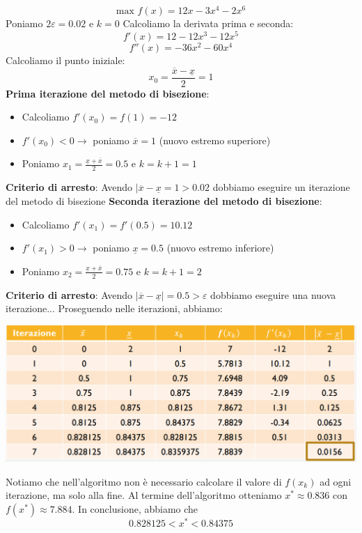 \documentclass[12pt]{article}
\begin{document}
$$\textrm{max } f(x) = 12x - 3x^4 - 2x^6$$
Poniamo $2\varepsilon = 0.02$ e $k = 0$ \newline
Calcoliamo la derivata prima e seconda:
$$f'(x) = 12 - 12x^3 - 12x^5$$
$$f''(x) = -36x^2 - 60x^4$$
Calcoliamo il punto iniziale:
$$x_0 = \frac{\overline{x} - \underline{x}}{2} = 1$$
\textbf{Prima iterazione del metodo di bisezione}:
\begin{itemize}
    \item Calcoliamo $f'(x_0) = f(1) = -12$
    \item $f'(x_0) < 0 \rightarrow$ poniamo $\overline{x} = 1$ (nuovo estremo superiore)
    \item Poniamo $x_1 = \frac{\underline{x} + \overline{x}}{2} = 0.5$ e $k = k+1 = 1$
\end{itemize}
\textbf{Criterio di arresto}: \newline
Avendo $|\overline{x} - \underline{x} = 1 > 0.02$ dobbiamo eseguire un iterazione del metodo di bisezione
\textbf{Seconda iterazione del metodo di bisezione}:
\begin{itemize}
    \item Calcoliamo $f'(x_1) = f'(0.5) = 10.12$
    \item $f'(x_1) > 0 \rightarrow$ poniamo $\underline{x} = 0.5$ (nuovo estremo inferiore)
    \item Poniamo $x_2 = \frac{\underline{x} + \overline{x}}{2} = 0.75$ e $k = k + 1 = 2$
\end{itemize}
\textbf{Criterio di arresto}: \newline
Avendo $|\overline{x} -  \underline{x}| = 0.5 > \varepsilon$ dobbiamo eseguire una nuova iterazione... \newline
Proseguendo nelle iterazioni, abbiamo:
\begin{center}
    \includegraphics[width =1\linewidth]{Images/97.PNG}
\end{center}
Notiamo che nell'algoritmo non è necessario calcolare il valore di $f(x_k)$ ad ogni iterazione, ma solo alla fine.
Al termine dell'algoritmo otteniamo $x^* \approx 0.836$ con $f(x^*) \approx 7.884$. In conclusione, abbiamo che
$$0.828125 < x^* < 0.84375$$
\end{document}
